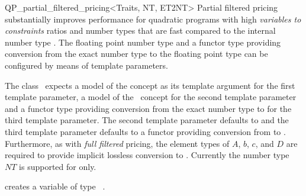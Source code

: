 \begin{ccRefClass}{QP_partial_filtered_pricing<Traits, NT, ET2NT>}
Partial filtered pricing substantially improves performance for
quadratic programs with high \emph{variables to constraints} ratios
and number types  that are fast compared
to the internal number type . The floating point number type 
and a functor type providing conversion from the exact number type  to
the floating point type  can be configured by means of template
parameters.   


\ccInheritsFrom
{}

\ccRequirements
\ccIndexRequirements

The class \ccRefName\ expects a model of the concept
 as its template argument for the first template parameter,
a model of the \cgal \ concept  for the second template
parameter and a functor type
providing conversion from the exact number type  to 
for the third template parameter. The second template parameter defaults to
 and the third template parameter defaults to a functor providing
conversion from  to .  
Furthermore, as with \emph{full filtered} pricing, the element types
of $A$, $b$, $c$, and $D$ are required to provide implicit lossless conversion
to . Currently the number type $NT$ is supported for  only.

\ccTypes \ccIndexClassTypes


\ccCreation
\ccIndexClassCreation
{}

{creates a variable of type \ccRefName\ .}


\ccUnchecked

\ccAccessFunctions
\begin{ccIndexMemberFunctions}




\ccModifiers
{}





\end{ccIndexMemberFunctions}
\end{ccRefClass}
